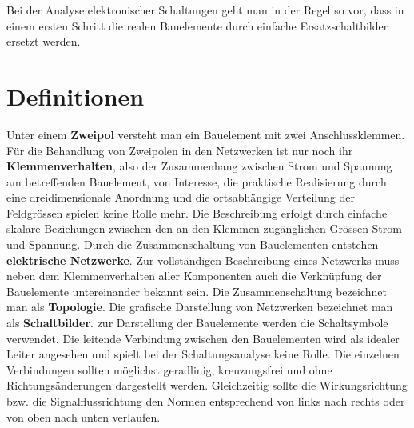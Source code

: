 Bei der Analyse elektronischer Schaltungen geht man in der Regel so vor, dass in einem ersten Schritt die realen Bauelemente durch einfache Ersatzschaltbilder ersetzt werden. 
\section{Definitionen}
Unter einem \textbf{Zweipol} versteht man ein Bauelement mit zwei Anschlussklemmen. Für die Behandlung von Zweipolen in den Netzwerken ist nur noch ihr \textbf{Klemmenverhalten}, also der Zusammenhang zwischen Strom und Spannung am betreffenden Bauelement, von Interesse, die praktische Realisierung durch eine dreidimensionale Anordnung und die ortsabhängige Verteilung der Feldgrössen spielen keine Rolle mehr. Die Beschreibung erfolgt durch einfache skalare Beziehungen zwischen den an den Klemmen zugänglichen Grössen Strom und Spannung.
\newline\newline
Durch die Zusammenschaltung von Bauelementen entstehen \textbf{elektrische Netzwerke}. Zur vollständigen Beschreibung eines Netzwerks muss neben dem Klemmenverhalten aller Komponenten auch die Verknüpfung der Bauelemente untereinander bekannt sein. Die Zusammenschaltung bezeichnet man als \textbf{Topologie}.
\newline\newline
Die grafische Darstellung von Netzwerken bezeichnet man als \textbf{Schaltbilder}. zur Darstellung der Bauelemente werden die Schaltsymbole verwendet. Die leitende Verbindung zwischen den Bauelementen wird als idealer Leiter angesehen und spielt bei der Schaltungsanalyse keine Rolle. Die einzelnen Verbindungen sollten möglichst geradlinig, kreuzungsfrei und ohne Richtungsänderungen dargestellt werden. Gleichzeitig sollte die Wirkungsrichtung bzw. die Signalflussrichtung den Normen entsprechend von links nach rechts oder von oben nach unten verlaufen.
